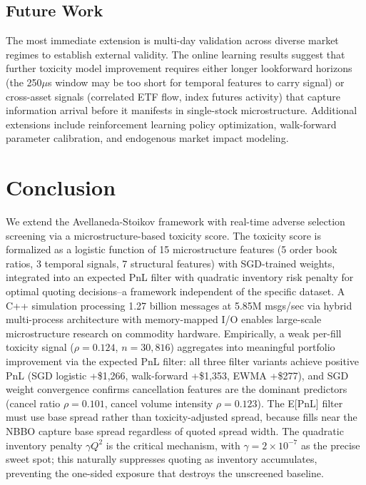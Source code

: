 \documentclass[11pt]{article}
\theoremstyle{definition}
\begin{document}
\subsection{Future Work}

The most immediate extension is multi-day validation across diverse market regimes to establish external validity. The online learning results suggest that further toxicity model improvement requires either longer lookforward horizons (the 250$\mu$s window may be too short for temporal features to carry signal) or cross-asset signals (correlated ETF flow, index futures activity) that capture information arrival before it manifests in single-stock microstructure. Additional extensions include reinforcement learning policy optimization, walk-forward parameter calibration, and endogenous market impact modeling.

\section{Conclusion}

We extend the Avellaneda-Stoikov framework with real-time adverse selection screening via a microstructure-based toxicity score. The toxicity score is formalized as a logistic function of 15 microstructure features (5 order book ratios, 3 temporal signals, 7 structural features) with SGD-trained weights, integrated into an expected PnL filter with quadratic inventory risk penalty for optimal quoting decisions--a framework independent of the specific dataset. A C++ simulation processing 1.27 billion messages at 5.85M msgs/sec via hybrid multi-process architecture with memory-mapped I/O enables large-scale microstructure research on commodity hardware. Empirically, a weak per-fill toxicity signal ($\rho = 0.124$, $n = 30{,}816$) aggregates into meaningful portfolio improvement via the expected PnL filter: all three filter variants achieve positive PnL (SGD logistic +\$1,266, walk-forward +\$1,353, EWMA +\$277), and SGD weight convergence confirms cancellation features are the dominant predictors (cancel ratio $\rho = 0.101$, cancel volume intensity $\rho = 0.123$). The E[PnL] filter must use base spread rather than toxicity-adjusted spread, because fills near the NBBO capture base spread regardless of quoted spread width. The quadratic inventory penalty $\gamma Q^2$ is the critical mechanism, with $\gamma = 2 \times 10^{-7}$ as the precise sweet spot; this naturally suppresses quoting as inventory accumulates, preventing the one-sided exposure that destroys the unscreened baseline.
\end{document}
